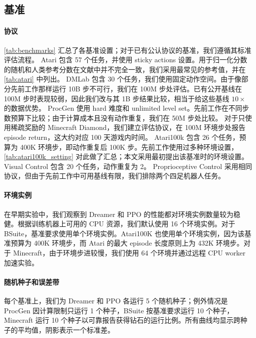 \clearpage
\vspace*{-3\baselineskip}
\subsection*{基准}

\paragraph{协议}
\cref{tab:benchmarks} 汇总了各基准设置；对于已有公认协议的基准，我们遵循其标准评估流程。
Atari \citep{bellemare2013ale} 包含 57 个任务，并使用 sticky actions 设置\citep{machado2018stickyactions}。用于归一化分数的随机和人类参考分数在文献中并不完全一致，我们采用最常见的参考值，并在 \cref{tab:atari} 中列出。
DMLab\citep{beattie2016dmlab} 包含 30 个任务\citep{espeholt2018impala}，我们使用固定动作空间\citep{hessel2019popart,kapturowski2018r2d2}。由于像部分先前工作那样运行 10B 步不可行，我们在 100M 步处评估。已有公开基线在 100M 步时表现较弱，因此我们改与其 1B 步结果比较，相当于给这些基线 $10\times$ 的数据优势。
ProcGen 使用 hard 难度和 unlimited level set\citep{cobbe2020procgen}。先前工作在不同步数预算下比较\citep{cobbe2020procgen,cobbe2021ppg}；由于计算成本且没有动作重复，我们在 50M 步处比较。
对于只使用稀疏奖励的 Minecraft Diamond，我们建立评估协议，在 100M 环境步处报告 episode return，这大约对应 100 天游戏内时间。
Atari100k\citep{kaiser2019simple} 包含 26 个任务，预算为 400K 环境步，即动作重复后 100K 步。先前工作使用过多种环境设置，\cref{tab:atari100k_setting} 对此做了汇总；本文采用最初提出该基准时的环境设置。
Visual Control\citep{tassa2018dmcontrol,hafner2019dreamer} 包含 20 个任务，动作重复为 2。
Proprioceptive Control 采用相同协议，但由于先前工作中可用基线有限，我们排除两个四足机器人任务\citep{yarats2021drqv2}。



\paragraph{环境实例}
在早期实验中，我们观察到 Dreamer 和 PPO 的性能都对环境实例数量较为稳健。根据训练机器上可用的 CPU 资源，我们默认使用 16 个环境实例。对于 BSuite，基准要求使用单个环境实例。Atari100K 也使用单个环境实例，因为该基准预算为 400K 环境步，而 Atari 的最大 episode 长度原则上为 432K 环境步。对于 Minecraft，由于环境步进较慢，我们使用 64 个环境并通过远程 CPU worker 加速实验。

\paragraph{随机种子和误差带}
每个基准上，我们为 Dreamer 和 PPO 各运行 5 个随机种子；例外情况是 ProcGen 因计算限制只运行 1 个种子，BSuite 按基准要求运行 10 个种子，Minecraft 运行 10 个种子以可靠报告获得钻石的运行比例。所有曲线均显示跨种子的平均值，阴影表示一个标准差。

